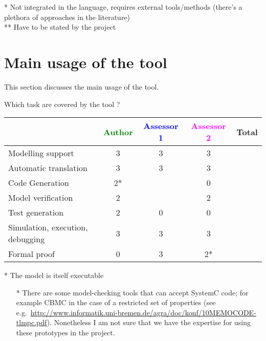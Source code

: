 \begin{author_comment}
 * Not integrated in the language, requires external tools/methods (there's a plethora of approaches in the literature)\\
 ** Have to be stated by the project
\end{author_comment}

\section{Main usage of the tool}
\label{main_usage}

This section discusses the main usage of the tool.

Which task are covered by the tool ?


\begin{tabular}{|l | c | c | c | c|}
\hline
& \textcolor{green}{Author} & \textcolor{blue}{Assessor 1} & \textcolor{magenta}{Assessor 2} & Total \\
\hline
Modelling support &3 &3 &3 & \\
\hline
Automatic translation &3 &3 &3 & \\
\hline
Code Generation &2* & &0 & \\
\hline
Model verification &2 & &2 & \\
\hline
Test generation &2 &0 &0 & \\
\hline
Simulation, execution, debugging &3 &3 &3 & \\
\hline
Formal proof &0 &3 &2* & \\
\hline
\end{tabular}

\begin{author_comment}
 * The model is itself executable
\end{author_comment}



\begin{assessor2}
  \begin{itemize}
  \item[*] There are some model-checking tools that can accept SystemC
    code; for example CBMC in the case of a restricted set of
    properties (see
    e.g.~\url{http://www.informatik.uni-bremen.de/agra/doc/konf/10MEMOCODE-tlmpc.pdf}). Nonetheless
    I am not sure that we have the expertise for using these
    prototypes in the project.
  \end{itemize}  
\end{assessor2}





